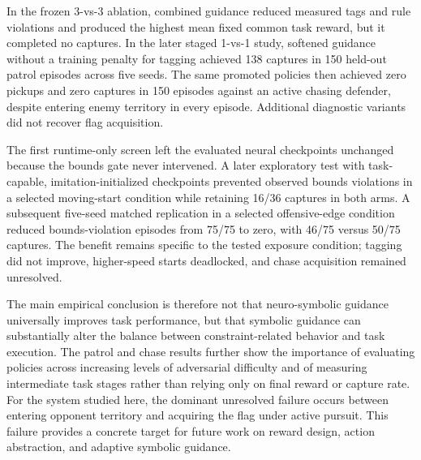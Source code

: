 \documentclass[letterpaper]{article}
\begin{document}
In the frozen 3-vs-3 ablation, combined guidance reduced measured tags and rule violations and produced the highest mean fixed common task reward, but it completed no captures. In the later staged 1-vs-1 study, softened guidance without a training penalty for tagging achieved 138 captures in 150 held-out patrol episodes across five seeds. The same promoted policies then achieved zero pickups and zero captures in 150 episodes against an active chasing defender, despite entering enemy territory in every episode. Additional diagnostic variants did not recover flag acquisition.

The first runtime-only screen left the evaluated neural checkpoints unchanged because the bounds gate never intervened. A later exploratory test with task-capable, imitation-initialized checkpoints prevented observed bounds violations in a selected moving-start condition while retaining 16/36 captures in both arms. A subsequent five-seed matched replication in a selected offensive-edge condition reduced bounds-violation episodes from 75/75 to zero, with 46/75 versus 50/75 captures. The benefit remains specific to the tested exposure condition; tagging did not improve, higher-speed starts deadlocked, and chase acquisition remained unresolved.

The main empirical conclusion is therefore not that neuro-symbolic guidance universally improves task performance, but that symbolic guidance can substantially alter the balance between constraint-related behavior and task execution. The patrol and chase results further show the importance of evaluating policies across increasing levels of adversarial difficulty and of measuring intermediate task stages rather than relying only on final reward or capture rate. For the system studied here, the dominant unresolved failure occurs between entering opponent territory and acquiring the flag under active pursuit. This failure provides a concrete target for future work on reward design, action abstraction, and adaptive symbolic guidance.



\end{document}
